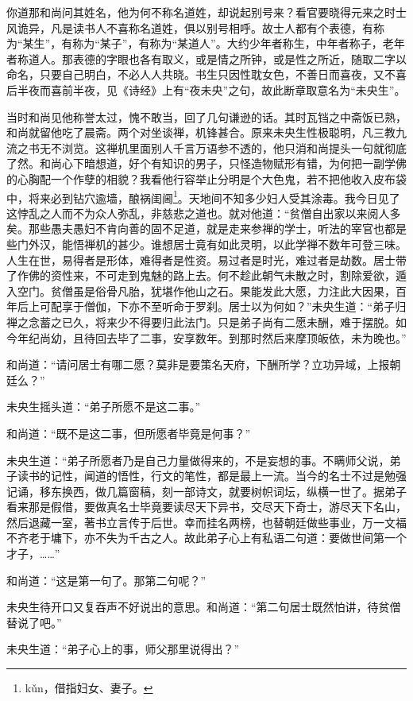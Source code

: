 \documentclass[a4paper,12pt,UTF8,twoside]{ctexbook}
\begin{document}
你道那和尚问其姓名，他为何不称名道姓，却说起别号来？看官要晓得元来之时士风诡异，凡是读书人不喜称名道姓，俱以别号相呼。故士人都有个表德，有称为“某生”，有称为“某子”，有称为“某道人”。大约少年者称生，中年者称子，老年者称道人。那表德的字眼也各有取义，或是情之所钟，或是性之所近，随取二字以命名，只要自己明白，不必人人共晓。书生只因性耽女色，不善日而喜夜，又不喜后半夜而喜前半夜，见《诗经》上有“夜未央”之句，故此断章取意名为“未央生”。

当时和尚见他称誉太过，愧不敢当，回了几句谦逊的话。其时瓦铛之中斋饭已熟，和尚就留他吃了晨斋。两个对坐谈禅，机锋甚合。原来未央生性极聪明，凡三教九流之书无不浏览。这禅机里面别人千言万语参不透的，他只消和尚提头一句就彻底了然。和尚心下暗想道，好个有知识的男子，只怪造物赋形有错，为何把一副学佛的心胸配一个作孽的相貌？我看他行容举止分明是个大色鬼，若不把他收入皮布袋中，将来必到钻穴逾墙，酿祸闺阃\footnote{k\v{u}n，借指妇女、妻子。}。天地间不知多少妇人受其涂毒。我今日见了这悖乱之人而不为众人弥乱，非慈悲之道也。就对他道：“贫僧自出家以来阅人多矣。那些愚夫愚妇不肯向善的固不足道，就是走来参禅的学士，听法的宰官也都是些门外汉，能悟禅机的甚少。谁想居士竟有如此灵明，以此学禅不数年可登三味。人生在世，易得者是形体，难得者是性资。易过者是时光，难过者是劫数。居士带了作佛的资性来，不可走到鬼魅的路上去。何不趁此朝气未散之时，割除爱欲，遁入空门。贫僧虽是俗骨凡胎，犹堪作他山之石。果能发此大愿，力注此大因果，百年后上可配享于僧伽，下亦不至听命于罗刹。居士以为何如？”未央生道：“弟子归禅之念蓄之已久，将来少不得要归此法门。只是弟子尚有二愿未酬，难于摆脱。如今年纪尚幼，且待回去毕了二事，安享数年。到那时然后来摩顶皈依，未为晚也。”

和尚道：“请问居士有哪二愿？莫非是要策名天府，下酬所学？立功异域，上报朝廷么？”

未央生摇头道：“弟子所愿不是这二事。”

和尚道：“既不是这二事，但所愿者毕竟是何事？”

未央生道：“弟子所愿者乃是自己力量做得来的，不是妄想的事。不瞒师父说，弟子读书的记性，闻道的悟性，行文的笔性，都是最上一流。当今的名士不过是勉强记诵，移东换西，做几篇窗稿，刻一部诗文，就要树帜词坛，纵横一世了。据弟子看来那是假借，要做真名士毕竟要读尽天下异书，交尽天下奇士，游尽天下名山，然后退藏一室，著书立言传于后世。幸而挂名两榜，也替朝廷做些事业，万一文福不齐老于墉下，亦不失为千古之人。故此弟子心上有私语二句道：要做世间第一个才子，……”

和尚道：“这是第一句了。那第二句呢？”

未央生待开口又复吞声不好说出的意思。和尚道：“第二句居士既然怕讲，待贫僧替说了吧。”

未央生道：“弟子心上的事，师父那里说得出？”
\end{document}
